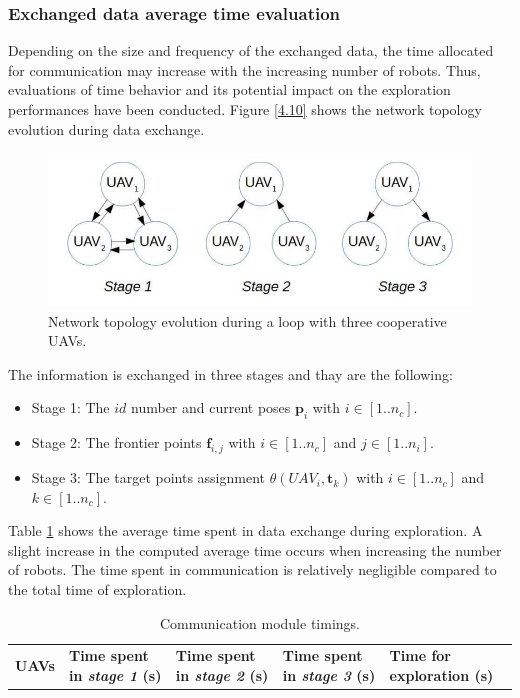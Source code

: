 \documentclass[11pt,openany]{book}
\begin{document}
\begin{algorimth}[H]
\subsubsection{Exchanged data average time evaluation}
Depending on the size and frequency of the exchanged data, the time allocated for communication may increase with the increasing number of robots. Thus, evaluations of time behavior and its potential impact on the exploration performances have been conducted. Figure \ref{4.10} shows the network topology evolution during data exchange.
\begin{figure}[H]
    \centering
    \includegraphics[scale=0.4]{assets/4_10.png}
    \caption{Network topology evolution during a loop with three cooperative UAVs.}
    \label{fig:4.10}
\end{figure}
The information is exchanged in three stages and thay are the following:
\begin{itemize}
    \item Stage 1: The $id$ number and current poses $\mathbf{p}_i$ with $i \in [1..n_c].$
    \item Stage 2: The frontier points $\mathbf{f}_{i,j}$ with $i \in [1..n_c]$ and $j \in [1..n_i]$.
    \item Stage 3: The target points assignment $\theta(UAV_i,\mathbf{t}_k)$ with $i \in [1..n_c]$ and $k \in [1..n_c]$.
\end{itemize}
Table \ref{tab:4.4} shows the average time spent in data exchange during exploration. A slight increase in the computed average time occurs when increasing the number of robots. The time spent in communication is relatively negligible compared to the total time of exploration.
\begin{table}[H]
    \centering
    \small
    \caption{Communication module timings.}
    \label{tab:4.4}
    \begin{tabular}{|p{0.8cm}|p{0.7cm}|p{0.7cm}|p{0.7cm}|p{0.7cm}|p{0.7cm}|p{0.7cm}|p{0.7cm}|p{0.7cm}|p{0.7cm}|p{0.7cm}|p{1cm}|}\hline
        \multicolumn{2}{|l|}{\multirow{2}{1cm}{\textbf{UAVs}}} & \multicolumn{3}{|p{2.1cm}|}{\textbf{Time spent in \textit{stage 1} (s)}} & \multicolumn{3}{|p{2.1cm}|}{\textbf{Time spent in \textit{stage 2} (s)}} & \multicolumn{3}{|p{2.1cm}|}{\textbf{Time spent in \textit{stage 3} (s)}} & \textbf{Time for exploration (s)}                                                                                                                      \\\cline{3-11}

\end{tabular}
\end{table}
\end{algorimth}
\end{document}
